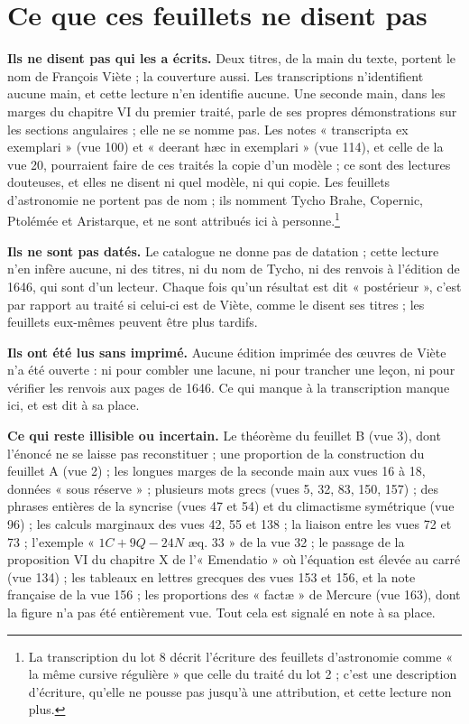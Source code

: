 \documentclass[11pt,a4paper]{article}
\begin{document}
\section*{Ce que ces feuillets ne disent pas}

\textbf{Ils ne disent pas qui les a écrits.} Deux titres, de la main du texte,
portent le nom de François Viète ; la couverture aussi. Les transcriptions
n'identifient aucune main, et cette lecture n'en identifie aucune. Une seconde
main, dans les marges du chapitre VI du premier traité, parle de ses propres
démonstrations sur les sections angulaires ; elle ne se nomme pas. Les notes
« transcripta ex exemplari » (vue 100) et « deerant hæc in exemplari » (vue 114),
et celle de la vue 20, pourraient faire de ces traités la copie d'un
modèle ; ce sont des lectures douteuses, et elles ne disent ni quel modèle, ni
qui copie. Les feuillets d'astronomie ne portent pas de nom ; ils nomment Tycho
Brahe, Copernic, Ptolémée et Aristarque, et ne sont attribués ici à
personne.\footnote{La transcription du lot 8 décrit l'écriture des feuillets
d'astronomie comme « la même cursive régulière » que celle du traité du lot 2 ;
c'est une description d'écriture, qu'elle ne pousse pas jusqu'à une attribution,
et cette lecture non plus.}

\textbf{Ils ne sont pas datés.} Le catalogue ne donne pas de datation ; cette
lecture n'en infère aucune, ni des titres, ni du nom de Tycho, ni des renvois
à l'édition de 1646, qui sont d'un lecteur. Chaque fois qu'un résultat est dit
« postérieur », c'est par rapport au traité si celui-ci est de Viète, comme
le disent ses titres ; les feuillets eux-mêmes peuvent être plus tardifs.

\textbf{Ils ont été lus sans imprimé.} Aucune édition imprimée des œuvres de
Viète n'a été ouverte : ni pour combler une lacune, ni pour trancher une leçon,
ni pour vérifier les renvois aux pages de 1646. Ce qui manque à la transcription
manque ici, et est dit à sa place.

\textbf{Ce qui reste illisible ou incertain.} Le théorème du feuillet B (vue 3),
dont l'énoncé ne se laisse pas reconstituer ; une proportion de la construction
du feuillet A (vue 2) ; les longues marges de la seconde main aux vues 16 à 18,
données « sous réserve » ; plusieurs mots grecs (vues 5, 32, 83, 150, 157) ; des
phrases entières de la syncrise (vues 47 et 54) et du climactisme symétrique
(vue 96) ; les calculs marginaux des vues 42, 55 et 138 ; la liaison entre les
vues 72 et 73 ; l'exemple « $1C + 9Q - 24N$ æq. $33$ » de la vue 32 ; le passage
de la proposition VI du chapitre X de l'« Emendatio » où l'équation est élevée au
carré (vue 134) ; les tableaux en lettres grecques des vues 153 et 156, et la note
française de la vue 156 ; les proportions des « factæ » de Mercure (vue 163), dont
la figure n'a pas été entièrement vue. Tout cela est signalé en note à sa place.
\end{document}
